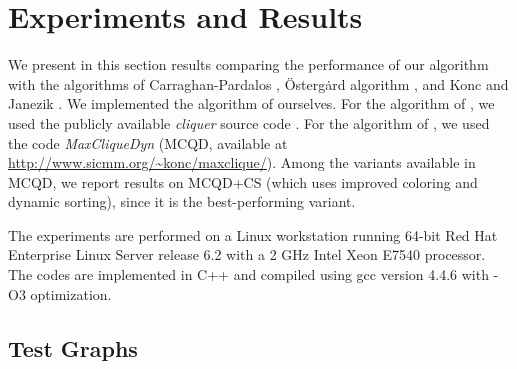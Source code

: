 \section{Experiments and Results}
\label{sec:experiments}

We present in this section results comparing the performance of our algorithm
with the algorithms of Carraghan-Pardalos \cite{pardalos}, 
\"{O}sterg\.{a}rd algorithm \cite{ostergard}, and
Konc and Janezik \cite{konc2007improved}. We implemented the algorithm of \cite{pardalos} ourselves. 
For the algorithm of \cite{ostergard},  we used the publicly available {\it cliquer} source code \cite{cliquer}.
For the algorithm of \cite{konc2007improved}, we used the code {\it MaxCliqueDyn} 
(MCQD, available at {\small \url{http://www.sicmm.org/~konc/maxclique/}}). 
Among the variants available in MCQD, we report results on 
MCQD+CS (which uses improved coloring and dynamic sorting),
since it is the best-performing variant.  

The experiments are performed on a Linux workstation running 64-bit Red Hat Enterprise Linux Server release 6.2 with a 2 GHz Intel Xeon E7540 processor. The codes are implemented in C++ and compiled using gcc version 4.4.6 with -O3 optimization.

\subsection{Test Graphs}

